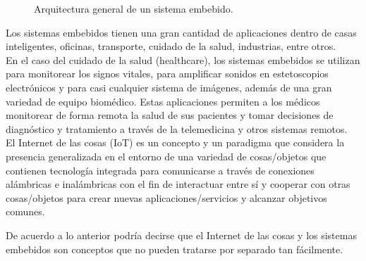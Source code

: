 	
	\begin{figure}[htbp!]
		\centering
		\caption{Arquitectura general de un sistema embebido.}
		\label{fig:MarcoArquiSE}
	\end{figure}

	Los sistemas embebidos tienen una gran cantidad de aplicaciones dentro de casas inteligentes, oficinas, transporte, cuidado de la salud, industrias, entre otros. \\
	
	En el caso del cuidado de la salud (healthcare), los sistemas embebidos se utilizan para monitorear los signos vitales, para amplificar sonidos en estetoscopios electrónicos y para casi cualquier sistema de imágenes, además de una gran variedad de equipo biomédico. Estas aplicaciones permiten a los médicos monitorear de forma remota la salud de sus pacientes y tomar decisiones de diagnóstico y tratamiento a través de la telemedicina y otros sistemas remotos. \cite{delkinEmbSys} \\
	
	El Internet de las cosas (IoT) es un concepto y un paradigma que considera la presencia generalizada en el entorno de una variedad de cosas/objetos que contienen tecnología integrada para comunicarse a través de conexiones alámbricas e inalámbricas con el fin de interactuar entre sí y cooperar con otras cosas/objetos para crear nuevas aplicaciones/servicios y alcanzar objetivos comunes. \cite{vermesanIoT}
	
	De acuerdo a lo anterior podría decirse que el Internet de las cosas y los sistemas embebidos son conceptos que no pueden tratarse por separado tan fácilmente.

\pagebreak
